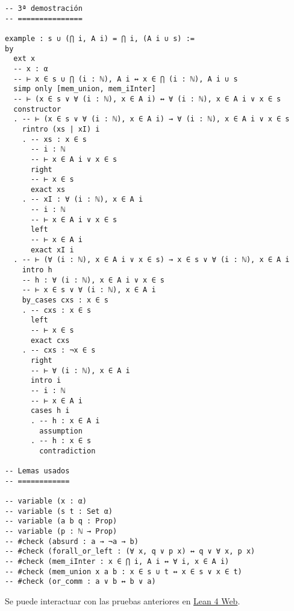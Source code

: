 \begin{verbatim}
-- 3ª demostración
-- ===============

example : s ∪ (⋂ i, A i) = ⋂ i, (A i ∪ s) :=
by
  ext x
  -- x : α
  -- ⊢ x ∈ s ∪ ⋂ (i : ℕ), A i ↔ x ∈ ⋂ (i : ℕ), A i ∪ s
  simp only [mem_union, mem_iInter]
  -- ⊢ (x ∈ s ∨ ∀ (i : ℕ), x ∈ A i) ↔ ∀ (i : ℕ), x ∈ A i ∨ x ∈ s
  constructor
  . -- ⊢ (x ∈ s ∨ ∀ (i : ℕ), x ∈ A i) → ∀ (i : ℕ), x ∈ A i ∨ x ∈ s
    rintro (xs | xI) i
    . -- xs : x ∈ s
      -- i : ℕ
      -- ⊢ x ∈ A i ∨ x ∈ s
      right
      -- ⊢ x ∈ s
      exact xs
    . -- xI : ∀ (i : ℕ), x ∈ A i
      -- i : ℕ
      -- ⊢ x ∈ A i ∨ x ∈ s
      left
      -- ⊢ x ∈ A i
      exact xI i
  . -- ⊢ (∀ (i : ℕ), x ∈ A i ∨ x ∈ s) → x ∈ s ∨ ∀ (i : ℕ), x ∈ A i
    intro h
    -- h : ∀ (i : ℕ), x ∈ A i ∨ x ∈ s
    -- ⊢ x ∈ s ∨ ∀ (i : ℕ), x ∈ A i
    by_cases cxs : x ∈ s
    . -- cxs : x ∈ s
      left
      -- ⊢ x ∈ s
      exact cxs
    . -- cxs : ¬x ∈ s
      right
      -- ⊢ ∀ (i : ℕ), x ∈ A i
      intro i
      -- i : ℕ
      -- ⊢ x ∈ A i
      cases h i
      . -- h : x ∈ A i
        assumption
      . -- h : x ∈ s
        contradiction

-- Lemas usados
-- ============

-- variable (x : α)
-- variable (s t : Set α)
-- variable (a b q : Prop)
-- variable (p : ℕ → Prop)
-- #check (absurd : a → ¬a → b)
-- #check (forall_or_left : (∀ x, q ∨ p x) ↔ q ∨ ∀ x, p x)
-- #check (mem_iInter : x ∈ ⋂ i, A i ↔ ∀ i, x ∈ A i)
-- #check (mem_union x a b : x ∈ s ∪ t ↔ x ∈ s ∨ x ∈ t)
-- #check (or_comm : a ∨ b ↔ b ∨ a)
\end{verbatim}
Se puede interactuar con las pruebas anteriores en \href{https://lean.math.hhu.de/\#url=https://raw.githubusercontent.com/jaalonso/Calculemus2/main/src/Union\_con\_interseccion\_general.lean}{Lean 4 Web}.

